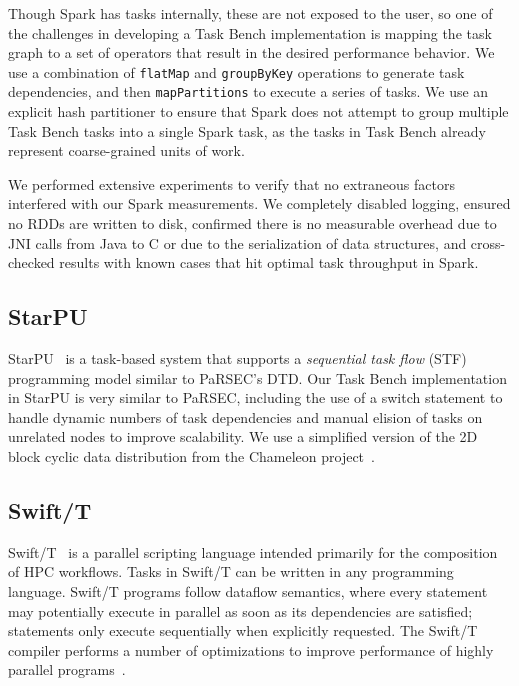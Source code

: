 Though Spark has tasks internally, these are not exposed to the user,
so one of the challenges in developing a Task Bench implementation is
mapping the task graph to a set of operators that result in the
desired performance behavior. We use a combination of
\lstinline[language=Scala]{flatMap} and
\lstinline[language=Scala]{groupByKey} operations to generate task
dependencies, and then \lstinline[language=Scala]{mapPartitions} to execute a
series of tasks. We use an explicit hash partitioner to ensure that
Spark does not attempt to group multiple Task Bench tasks into a
single Spark task, as the tasks in Task Bench already represent coarse-grained units of work.

We performed extensive experiments to verify that no
extraneous factors interfered with our Spark measurements. We
completely disabled logging, ensured no RDDs are written
to disk, confirmed there is no measurable overhead due to JNI
calls from Java to C or due to the serialization of data structures, and cross-checked results with known cases
that hit optimal task throughput in Spark.

\subsection{StarPU}

StarPU~\cite{StarPU11} is a task-based system that supports a \emph{sequential task flow} (STF)
programming model similar to PaRSEC's DTD. Our Task Bench implementation in
StarPU is very similar to PaRSEC, including the use of a switch
statement to handle dynamic numbers of task dependencies and manual
elision of tasks on unrelated nodes to improve scalability.
We use a simplified version of the 2D block cyclic data distribution from the Chameleon 
project~\cite{Chameleon}.

\subsection{Swift/T}

Swift/T~\cite{Wozniak13} is a parallel scripting language intended
primarily for the composition of HPC workflows. Tasks in Swift/T can be written in any
programming language. Swift/T
programs follow dataflow semantics, where every statement may
potentially execute in parallel as soon as its dependencies are
satisfied; statements only execute sequentially when explicitly
requested. The Swift/T compiler performs a number of optimizations to
improve performance of highly parallel programs~\cite{Armstrong14}.

